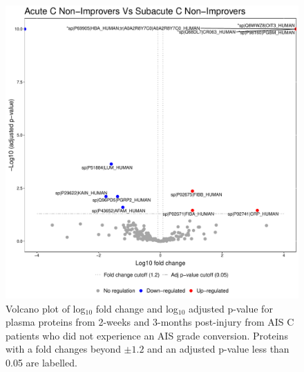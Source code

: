\documentclass[9pt,lineno]{elife}
\begin{document}
\begin{landscape}
\begin{landscape}
\begin{landscape}
\begin{landscape}
\begin{figure}
\includegraphics[width=1\linewidth]{figures/openms_protein_quantification/label_free/volcano_plots/openms_volcano_plot_2021-08-10_0017} \caption{Volcano plot of log\(_10\) fold change and log\(_10\) adjusted p-value for plasma proteins from 2-weeks and 3-months post-injury from AIS C patients who did not experience an AIS grade conversion. Proteins with a fold changes beyond \(\pm 1.2\) and an adjusted p-value less than 0.05 are labelled.}\label{fig:volc-plot-acute-c-nonimp-vs-subacute-nonimp}
\end{figure}




\end{landscape}
\end{landscape}
\end{landscape}
\end{landscape}
\end{document}
